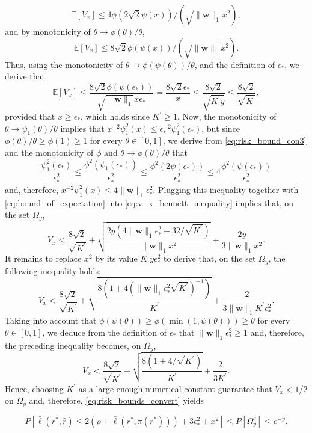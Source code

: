 \documentclass[letterpaper]{article} %
\def\SingleColumn{}
\newcommand{\E}{\mathbb{E}}
\newcommand{\Pro}{P}
\newcommand{\weight}{\mathbf{w}}
\newcommand{\relossf}{\bar{\ell}}
\newcommand{\normo}[1]{\|#1\|_1}
\begin{document}
    \[\E[V_x]\le 4\phi(2\sqrt{2}\psi(x))/(\sqrt{\normo{\weight{}}}x^2),\]
    and by monotonicity of $\theta\to\phi(\theta)/\theta$,
    \[\E[V_x]\le 8\sqrt{2}\phi(\psi(x))/(\sqrt{\normo{\weight{}}}x^2).\]
    Thus, using the monotonicity of $\theta\to \phi(\psi(\theta))/\theta$, and the definition of $\epsilon_*$, we derive that
    \begin{equation}
        \label{eq:bound_of_expectation}
        \E[V_x]\le \frac{8\sqrt{2}\phi(\psi(\epsilon_*))}{\sqrt{\normo{\weight{}}}x\epsilon_*}=\frac{8\sqrt{2}\epsilon_*}{x}\le \frac{8\sqrt{2}}{\sqrt{K^\prime y}}\le \frac{8\sqrt{2}}{\sqrt{K^\prime}},
    \end{equation}
    provided that $x\ge \epsilon_*$, which holds since $K^\prime\ge 1$. Now, the monotonicity of $\theta\to\psi_1(\theta)/\theta$ implies that $x^{-2}\psi_1^2(x)\le \epsilon_*^{-2}\psi_1^2(\epsilon_*)$, but since $\phi(\theta)/\theta\ge \phi(1)\ge 1$ for every $\theta\in [0,1]$, we derive from \eqref{eq:risk_bound_con3} and the monotonicity of $\phi$ and $\theta\to\phi(\theta)/\theta$ that
    \[\frac{\psi_1^2(\epsilon_*)}{\epsilon_*^2}\le \frac{\phi^2(\psi_1(\epsilon_*))}{\epsilon_*^2}\le \frac{\phi^2(2\psi(\epsilon_*))}{\epsilon_*^2}\le 4\frac{\phi^2(\psi(\epsilon_*))}{\epsilon_*^2}\]
    and, therefore, $x^{-2}\psi_1^2(x)\le 4\normo{\weight{}}\epsilon_*^2$. Plugging this inequality together with \eqref{eq:bound_of_expectation} into \eqref{eq:v_x_bennett_inequality} implies that, on the set $\Omega_y$,
    \[V_x < \frac{8\sqrt{2}}{\sqrt{K^\prime}}+\sqrt{\frac{2y(4\normo{\weight{}}\epsilon_*^2+32/\sqrt{K^\prime})}{\normo{\weight{}}x^2}}+\frac{2y}{3\normo{\weight{}}x^2}.\]
    It remains to replace $x^2$ by its value $K^\prime y\epsilon_*^2$ to derive that, on the set $\Omega_y$, the following inequality holds:
    \[V_x < \frac{8\sqrt{2}}{\sqrt{K^\prime}}+\sqrt{\frac{8(1+4(\normo{\weight{}}\epsilon_*^2\sqrt{K^\prime})^{-1})}{K^\prime}}+\frac{2}{3\normo{\weight{}}K^\prime\epsilon_*^2}.\]
    Taking into account that $\phi(\psi(\theta))\ge \phi(\min(1,\psi(\theta)))\ge \theta$ for every $\theta\in [0,1]$, we deduce from the definition of $\epsilon_*$ that $\normo{\weight{}}\epsilon_*^2\ge 1$ and, therefore, the preceding inequality becomes, on $\Omega_y$,
    \[V_x < \frac{8\sqrt{2}}{\sqrt{K^\prime}}+\sqrt{\frac{8(1+4/\sqrt{K^\prime})}{K^\prime}}+\frac{2}{3K^\prime}.\]
    Hence, choosing $K^\prime$ as a large enough numerical constant guarantee that $V_x < 1/2$ on $\Omega_y$ and, therefore, \eqref{eq:risk_bounds_convert} yields
    \SingleColumn
    \begin{equation}
        \label{eq:risk_bounds_convert}
        \Pro[\relossf(r^*,\hat{r})\le 2(\rho+\relossf(r^*,\pi(r^*)))+3\epsilon_*^2+x^2]\le \Pro[\Omega_y^c]\le e^{-y}.
    \end{equation}
\end{document}
